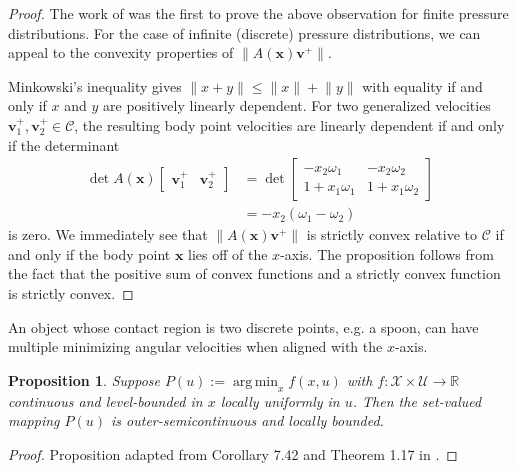 \documentclass[conference]{IEEEtran}
\newtheorem{proposition}{Proposition}
\DeclareMathOperator*{\argmin}{arg\,min}
\begin{document}
\begin{proof}
  The work of \cite{Mason1982} was the first to prove the above
  observation for finite pressure distributions. For the case of
  infinite (discrete) pressure distributions, we can appeal to the
  convexity properties of $\lVert A(\mathbf{x})\mathbf{v}^+ \rVert$.

  Minkowski's inequality gives
  $\lVert x + y \rVert \leq \lVert x \rVert + \lVert y \rVert$ with
  equality if and only if $x$ and $y$ are positively linearly
  dependent. For two generalized velocities
  $\mathbf{v}^+_1,\mathbf{v}^+_2\in \mathcal{C}$, the resulting body
  point velocities are linearly dependent if and only if the
  determinant
  \begin{align}
    \det A(\mathbf{x})
      \begin{bmatrix*}
        \mathbf{v}^+_1 & \mathbf{v}^+_2
      \end{bmatrix*}
    &= \det
     \begin{bmatrix*}
       -x_2\omega_1 & -x_2\omega_2 \\
       1 + x_1\omega_1 & 1 + x_1\omega_2 
     \end{bmatrix*}\\
    &= -x_2(\omega_1 - \omega_2)
  \end{align}
  is zero. We immediately see that
  $\lVert A(\mathbf{x})\mathbf{v}^+ \rVert$ is strictly convex
  relative to $\mathcal{C}$ if and only if the body point $\mathbf{x}$
  lies off of the $x$-axis. The proposition follows from the fact that
  the positive sum of convex functions and a strictly convex function
  is strictly convex.
\end{proof}

An object whose contact region is two discrete points, e.g. a spoon,
can have multiple minimizing angular velocities when aligned with the
$x$-axis.

\begin{proposition}\label{prop:var-analysis}
  Suppose $P(u) := \argmin_x f(x,u)$ with
  $f:\mathcal{X}\times\mathcal{U}\rightarrow\mathbb{R}$ continuous and
  level-bounded in $x$ locally uniformly in $u$. Then the set-valued
  mapping $P(u)$ is outer-semicontinuous and locally bounded.
\end{proposition}

\begin{proof}
  Proposition adapted from Corollary 7.42 and Theorem 1.17 in
  \cite{Rockafellar}.
\end{proof}
\end{document}
